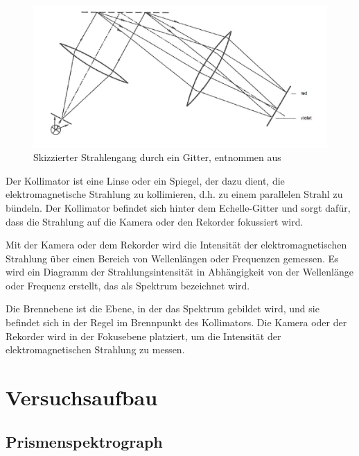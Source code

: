 \documentclass[12pt,english,ngerman]{scrartcl}
\begin{document}
\begin{figure}[H]
	\begin{center}
		\includegraphics[width =\textwidth]{./figures/skizze_gitter.png}
	\end{center}
	\caption[Skizzierter Strahlengang durch ein Gitter] {Skizzierter Strahlengang durch ein
		Gitter, entnommen aus~\cite{unterlagen}
	}\label{fig:gitter}
\end{figure}

Der Kollimator ist eine Linse oder ein Spiegel, der dazu dient, die
elektromagnetische Strahlung zu kollimieren, d.h. zu einem parallelen Strahl zu
bündeln. Der Kollimator befindet sich hinter dem Echelle-Gitter und sorgt
dafür, dass die Strahlung auf die Kamera oder den Rekorder fokussiert wird.

Mit der Kamera oder dem Rekorder wird die Intensität der elektromagnetischen
Strahlung über einen Bereich von Wellenlängen oder Frequenzen gemessen. Es wird
ein Diagramm der Strahlungsintensität in Abhängigkeit von der Wellenlänge oder
Frequenz erstellt, das als Spektrum bezeichnet wird.

Die Brennebene ist die Ebene, in der das Spektrum gebildet wird, und sie
befindet sich in der Regel im Brennpunkt des Kollimators. Die Kamera oder der
Rekorder wird in der Fokusebene platziert, um die Intensität der
elektromagnetischen Strahlung zu messen.


\section{Versuchsaufbau}\label{sec:aufbau}

\subsection{Prismenspektrograph}
\end{document}

